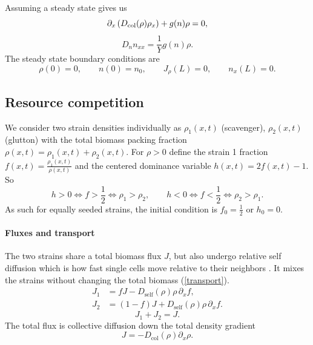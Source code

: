 \documentclass[11pt,a4paper]{report}
\newcommand{\Dcol}{D_{\mathrm{col}}}
\newcommand{\Dself}{D_{\mathrm{self}}}
\newcommand{\pd}{\partial}
\begin{document}
Assuming a steady state gives us
\begin{equation}
	{
		\partial_x\left(D_{\rm col}(\rho)\rho_x\right)+g(n)\rho=0,
	}
	\label{eq:steady_rho_new}
\end{equation}
\begin{equation}
	{
		D_n n_{xx}=\frac{1}{Y}g(n)\rho.
	}
	\label{eq:steady_n_new}
\end{equation}
The steady state boundary conditions are
\begin{equation}
	{
		\rho(0)=0,
		\qquad
		n(0)=n_0,
		\qquad
		J_\rho(L)=0,
		\qquad
		n_x(L)=0.
	}
	\label{eq:steady_bcs_new}
\end{equation}
\subsection{Resource competition}	
We consider two strain densities individually as $\rho_1(x,t)$ (scavenger), $\rho_2(x,t)$ (glutton) with the total biomass packing fraction $\rho(x,t)=\rho_1(x,t)+\rho_2(x,t)$. For $\rho>0$ define the strain 1 fraction $f(x,t)=\frac{\rho_1(x,t)}{\rho(x,t)}$
and the centered dominance variable $h(x,t)=2f(x,t)-1$.
So
\begin{equation}
	h>0 \Longleftrightarrow f>\frac{1}{2} \Longleftrightarrow \rho_1>\rho_2,
	\qquad
	h<0 \Longleftrightarrow f<\frac{1}{2} \Longleftrightarrow \rho_2>\rho_1.
\end{equation}
As such for equally seeded strains, the initial condition is $f_0=\frac{1}{2}$ or $h_0=0$.
\paragraph{Fluxes and transport}	
The two strains share a total biomass flux \(J\), but also undergo relative self diffusion which is how fast single cells move relative to their neighbors \cite{Karita}. It mixes the strains without changing the total biomass (\cref{transport}).
\begin{align}
	J_1 &= fJ-\Dself(\rho)\rho\,\pd_x f,
	\label{eq:J1}\\
	J_2 &= (1-f)J+\Dself(\rho)\rho\,\pd_x f.
	\label{eq:J2}
\end{align}
\begin{equation}
	J_1+J_2=J.
\end{equation}
The total flux is collective diffusion down the total density gradient \cite{Karita, slepukhin, Fick}
\begin{equation}
	J=-\Dcol(\rho)\pd_x\rho.
	\label{eq:total-J}
\end{equation}
\end{document}
